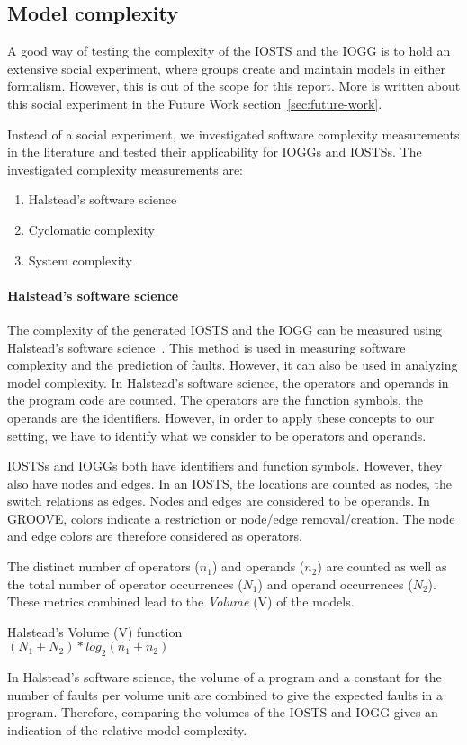 \subsection{Model complexity}\label{sec:complexity_measurement}
A good way of testing the complexity of the IOSTS and the IOGG is to hold an extensive social experiment, where groups create and maintain models in either formalism. However, this is out of the scope for this report. More is written about this social experiment in the Future Work section~\ref{sec:future-work}.

Instead of a social experiment, we investigated software complexity measurements in the literature and tested their applicability for IOGGs and IOSTSs. The investigated complexity measurements are:
\begin{enumerate}
\item Halstead's software science
\item Cyclomatic complexity
\item System complexity
\end{enumerate}

\paragraph*{Halstead's software science} The complexity of the generated IOSTS and the IOGG can be measured using Halstead's software science~\cite{Halstead:software-science}. This method is used in measuring software complexity and the prediction of faults. However, it can also be used in analyzing model complexity. In Halstead's software science, the operators and operands in the program code are counted. The operators are the function symbols, the operands are the identifiers. However, in order to apply these concepts to our setting, we have to identify what we consider to be operators and operands.

IOSTSs and IOGGs both have identifiers and function symbols. However, they also have nodes and edges. In an IOSTS, the locations are counted as nodes, the switch relations as edges. Nodes and edges are considered to be operands. In GROOVE, colors indicate a restriction or node/edge removal/creation. The node and edge colors are therefore considered as operators.

The distinct number of operators ($n_1$) and operands ($n_2$) are counted as well as the total number of operator occurrences ($N_1$) and operand occurrences ($N_2$). These metrics combined lead to the \textit{Volume} (V) of the models.
\vspace{10px}\begin{definition} Halstead's Volume (V) function \\
$(N_1+N_2)*\mathit{log}_2(n_1+n_2)$
\end{definition}\vspace{10px}
In Halstead's software science, the volume of a program and a constant for the number of faults per volume unit are combined to give the expected faults in a program. Therefore, comparing the volumes of the IOSTS and IOGG gives an indication of the relative model complexity.

